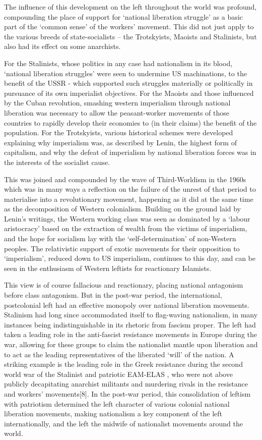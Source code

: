 The influence of this development on the left throughout the world was profound, compounding the place of support for ‘national liberation struggle’ as a basic part of the ‘common sense’ of the workers’ movement.
This did not just apply to the various breeds of state-socialists – the Trotskyists, Maoists and Stalinists, but also had its effect on some anarchists.

For the Stalinists, whose politics in any case had nationalism in its blood, ‘national liberation struggles’ were seen to undermine US machinations, to the benefit of the USSR - which supported such struggles materially or politically in pursuance of its own imperialist objectives.
For the Maoists and those influenced by the Cuban revolution, smashing western imperialism through national liberation was necessary to allow the peasant-worker movements of those countries to rapidly develop their economies to (in their claims) the benefit of the population.
For the Trotskyists, various historical schemes were developed explaining why imperialism was, as described by Lenin, the highest form of capitalism, and why the defeat of imperialism by national liberation forces was in the interests of the socialist cause.

This was joined and compounded by the wave of Third-Worldism in the 1960s which was in many ways a reflection on the failure of the unrest of that period to materialise into a revolutionary movement, happening as it did at the same time as the decomposition of Western colonialism.
Building on the ground laid by Lenin’s writings, the Western working class was seen as dominated by a ‘labour aristocracy’ based on the extraction of wealth from the victims of imperialism, and the hope for socialism lay with the ‘self-determination’ of non-Western peoples.
The relativistic support of exotic movements for their opposition to ‘imperialism’, reduced down to US imperialism, continues to this day, and can be seen in the enthusiasm of Western leftists for reactionary Islamists.

This view is of course fallacious and reactionary, placing national antagonism before class antagonism.
But in the post-war period, the international, postcolonial left had an effective monopoly over national liberation movements.
Stalinism had long since accommodated itself to flag-waving nationalism, in many instances being indistinguishable in its rhetoric from fascism proper.
The left had taken a leading role in the anti-fascist resistance movements in Europe during the war, allowing for these groups to claim the nationalist mantle upon liberation and to act as the leading representatives of the liberated ‘will’ of the nation.
A striking example is the leading role in the Greek resistance during the second world war of the Stalinist and patriotic EAM-ELAS , who were not above publicly decapitating anarchist militants and murdering rivals in the resistance and workers’ movements[8].
In the post-war period, this consolidation of leftism with patriotism determined the left character of various colonial national liberation movements, making nationalism a key component of the left internationally, and the left the midwife of nationalist movements around the world.


